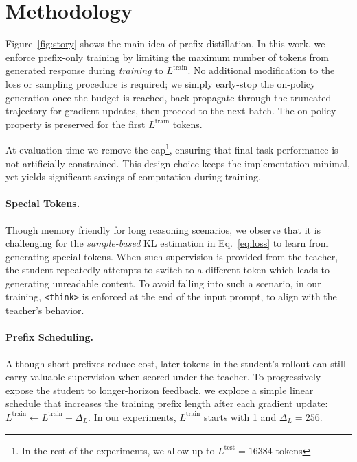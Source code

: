 \documentclass[11pt]{article}
\begin{document}
\section{Methodology}  

Figure~\ref{fig:story} shows the main idea of prefix distillation.
In this work, we enforce prefix-only training by limiting the maximum number of tokens from generated response during \emph{training} to $L^{\text{train}}$. 
No additional modification to the loss or sampling procedure is required; we simply early-stop the on-policy generation once the budget is reached, back-propagate through the truncated trajectory for gradient updates, then proceed to the next batch. The on-policy property is preserved for the first $L^{\text{train}}$ tokens.

At evaluation time we remove the cap\footnote{In the rest of the experiments, we allow up to $L^{\text{test}}{=}16384$ tokens}, ensuring that final task performance is not artificially constrained.    
This design choice keeps the implementation minimal, yet yields significant savings of computation during training. 
  
\paragraph{Special Tokens.} Though memory friendly for long reasoning scenarios, we observe that it is challenging for the \emph{sample-based} KL estimation in Eq.~\ref{eq:loss} to learn from generating special tokens. When such supervision is provided from the teacher, the student repeatedly attempts to switch to a different token which leads to generating unreadable content. To avoid falling into such a scenario, in our training, \texttt{<think>} is enforced at the end of the input prompt, to align with the teacher's behavior.

\paragraph{Prefix Scheduling.}  
Although short prefixes reduce cost, later tokens in the student's rollout can still carry valuable supervision when scored under the teacher. To progressively expose the student to longer-horizon feedback, we explore a simple linear schedule that increases the training prefix length after each gradient update:  
$  
L^{\text{train}} \leftarrow L^{\text{train}} + \Delta_L  
$.
In our experiments, $L^{\text{train}}$ starts with 1 and $\Delta_L = 256$.
\end{document}
